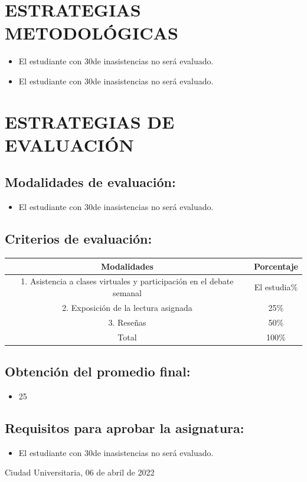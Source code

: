 \documentclass[a4paper]{article}
\begin{document}
\section {ESTRATEGIAS METODOLÓGICAS}
\begin{itemize}
\item El estudiante con 30de inasistencias no será evaluado.
\end{itemize}
\begin{itemize}
\item El estudiante con 30de inasistencias no será evaluado.
\end{itemize}
\section {ESTRATEGIAS DE EVALUACIÓN}
\subsection {Modalidades de evaluación:}
\begin{itemize}
\item El estudiante con 30de inasistencias no será evaluado.
\end{itemize}
\subsection {Criterios de evaluación:}
\begin{table}[ht]
\centering
\begin{tabular}{|c|c|}
\hline
\textbf{Modalidades} & \textbf{Porcentaje} \\ 
\hline
1. Asistencia a clases virtuales y participación en el debate semanal & El estudia\% \\ 
\hline
2. Exposición de la lectura asignada & 25\% \\ 
\hline
3. Reseñas & 50\% \\ 
\hline
Total & 100\% \\ 
\hline 
\end{tabular}
\end{table}
\subsection {Obtención del promedio final:}
\begin{itemize}
\item 25
\end{itemize}
\subsection {Requisitos para aprobar la asignatura:}
\begin{itemize}
\item El estudiante con 30de inasistencias no será evaluado.
\end{itemize}
\begin{flushright}
Ciudad Universitaria, 06 de abril de 2022
\end{flushright}
\end{document}
